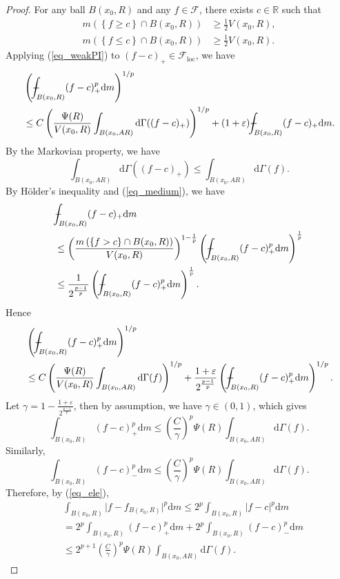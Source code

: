 \documentclass[11pt,a4paper]{article}
\numberwithin{equation}{section}
\def\Xint#1{\mathchoice
{\XXint\displaystyle\textstyle{#1}}%
{\XXint\textstyle\scriptstyle{#1}}%
{\XXint\scriptstyle\scriptscriptstyle{#1}}%
{\XXint\scriptscriptstyle\scriptscriptstyle{#1}}%
\!\int}
\def\XXint#1#2#3{{\setbox0=\hbox{$#1{#2#3}{\int}$ }
\vcenter{\hbox{$#2#3$ }}\kern-.6\wd0}}
\def\dashint{\Xint-}
\theoremstyle{plain}
\theoremstyle{definition}
\begin{document}
\begin{proof}
For any ball $B(x_0,R)$ and any $f\in \mathcal{F}$, there exists $c\in \mathbb{R}$ such that
\begin{equation}\label{eq_medium}
\begin{aligned}
m \left(\left\{f\ge c\right\}\cap B(x_0,R)\right)&\ge \frac{1}{2}V(x_0,R),\\
m \left(\left\{f\le c\right\}\cap B(x_0,R)\right)&\ge \frac{1}{2}V(x_0,R).
\end{aligned}
\end{equation}
Applying (\ref{eq_weakPI}) to $(f-c)_+\in \mathcal{F}_{\mathrm{loc}}$, we have
\begin{align*}
&\left(\dashint_{B(x_0,R)}(f-c)_+^p \mathrm{d}m\right)^{1/p}\\
&\le C\left(\frac{\Psi(R)}{V(x_0,R)}\int_{B(x_0,AR)} \mathrm{d}\Gamma((f-c)_+)\right)^{1/p}+(1+\varepsilon) \dashint_{B(x_0,R)}(f-c)_+ \mathrm{d}m.
\end{align*}
By the Markovian property, we have
$$\int_{B(x_0,AR)} \mathrm{d}\Gamma((f-c)_+)\le \int_{B(x_0,AR)} \mathrm{d}\Gamma(f).$$
By H\"older's inequality and (\ref{eq_medium}), we have
\begin{align*}
&\dashint_{B(x_0,R)}(f-c)_+ \mathrm{d}m\\
&\le \left(\frac{m \left(\left\{f>c\right\}\cap B(x_0,R)\right)}{V(x_0,R)}\right)^{1-\frac{1}{p}} \left(\dashint_{B(x_0,R)}(f-c)_+^p \mathrm{d}m\right)^{\frac{1}{p}}\\
&\le \frac{1}{2^{\frac{p-1}{p}}}\left(\dashint_{B(x_0,R)}(f-c)_+^p \mathrm{d}m\right)^{\frac{1}{p}}.
\end{align*}
Hence
\begin{align*}
&\left(\dashint_{B(x_0,R)}(f-c)_+^p \mathrm{d}m\right)^{1/p}\\
&\le C\left(\frac{\Psi(R)}{V(x_0,R)}\int_{B(x_0,AR)} \mathrm{d}\Gamma(f)\right)^{1/p}+\frac{1+\varepsilon}{2^{\frac{p-1}{p}}}\left(\dashint_{B(x_0,R)}(f-c)_+^p \mathrm{d}m\right)^{{1}/{p}}.
\end{align*}
Let $\gamma=1-\frac{1+\varepsilon}{2^{\frac{p-1}{p}}}$, then by assumption, we have $\gamma\in(0,1)$, which gives
$$\int_{B(x_0,R)}(f-c)_+^p \mathrm{d}m\le \left(\frac{C}{\gamma}\right)^p{\Psi(R)}\int_{B(x_0,AR)} \mathrm{d}\Gamma(f).$$
Similarly,
$$\int_{B(x_0,R)}(f-c)_-^p \mathrm{d}m\le \left(\frac{C}{\gamma}\right)^p{\Psi(R)}\int_{B(x_0,AR)} \mathrm{d}\Gamma(f).$$
Therefore, by (\ref{eq_ele}),
\begin{align*}
&\int_{B(x_0,R)} \lvert f-f_{B(x_0,R)}\rvert^p \mathrm{d}m\le 2^p\int_{B(x_0,R)} \lvert f-c\rvert^p \mathrm{d}m\\
&=2^p\int_{B(x_0,R)} (f-c)_+^p \mathrm{d}m+2^p\int_{B(x_0,R)} (f-c)_-^p \mathrm{d}m\\
&\le 2^{p+1}\left(\frac{C}{\gamma}\right)^p{\Psi(R)}\int_{B(x_0,AR)} \mathrm{d}\Gamma(f).
\end{align*}
\end{proof}
\end{document}
